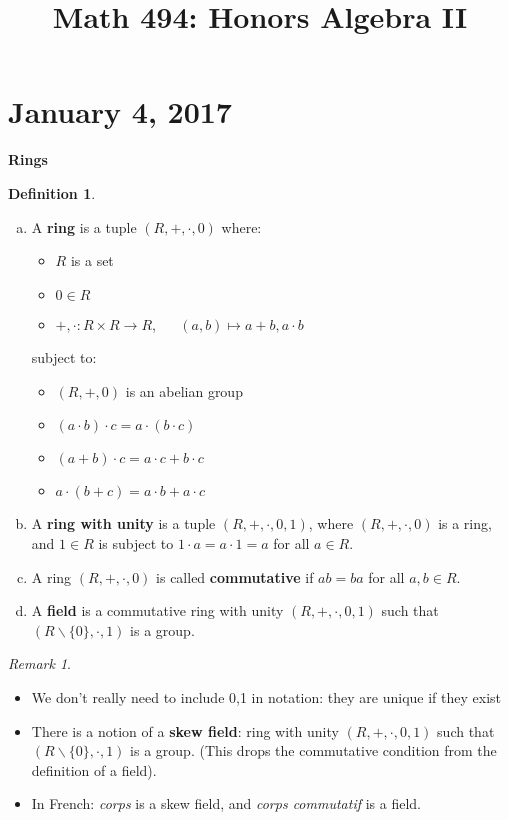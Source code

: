 \documentclass{amsart}
\theoremstyle{definition}
\newtheorem{defn}[thm]{Definition}
\theoremstyle{remark}
\newtheorem*{rmk}{Remark}
\begin{document}
\title{Math 494: Honors Algebra II}
\maketitle
\tableofcontents
\section{January 4, 2017} %
\noindent \textbf{Rings}
\begin{defn} \hspace{0.5cm}
    \begin{enumerate}[a)]
    \item A \textbf{ring} is a tuple $(R, +, \cdot, 0)$ where:
    \begin{itemize}
        \item $R$ is a set
        \item $0 \in R$
        \item $+,\cdot: R \times R \rightarrow R$, $\quad$  $(a,b) \mapsto a + b, a \cdot b$
    \end{itemize}
    subject to:
    \begin{itemize}
        \item $(R, +, 0)$ is an abelian group
        \item $(a \cdot b) \cdot c = a \cdot (b \cdot c)$
        \item $(a + b) \cdot c = a \cdot c + b \cdot c$
        \item $a \cdot (b + c) = a \cdot b + a \cdot c$
    \end{itemize}
    \item A \textbf{ring with unity} is a tuple $(R, +, \cdot, 0, 1)$, where
    $(R,+,\cdot,0)$ is a ring, and $1 \in R$ is subject to $1 \cdot a = a \cdot 1 = a$
    for all $a \in R$.
    \item A ring $(R, +, \cdot, 0)$ is called \textbf{commutative} if $ab = ba$ for all
    $a, b \in R$.
    \item A \textbf{field} is a commutative ring with unity $(R,+,\cdot,0,1)$ such
    that $(R \backslash \{0\}, \cdot, 1)$ is a group.
    \end{enumerate}
\end{defn}
\begin{rmk} \hspace{0.5cm}
    \begin{itemize}
        \item We don't really need to include 0,1 in notation: they are unique
        if they exist
        \item There is a notion of a \textbf{skew field}: ring with unity
        $(R,+,\cdot,0,1)$ such that $(R \backslash \{0\}, \cdot , 1)$ is a group.
        (This drops the commutative condition from the definition of a field).
        \item In French: \textit{corps} is a skew field, and \textit{corps commutatif} is a field.
    \end{itemize}
\end{rmk}
\end{document}
